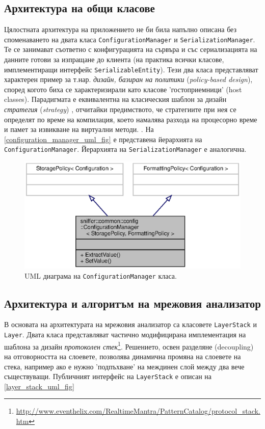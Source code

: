 \documentclass[12pt,a4paper,oneside]{book}
\begin{document}
\subsection{Архитектура на общи класове}

Цялостната архитектура на приложението не би била напълно описана без
споменаването на двата класа \texttt{ConfigurationManager} и
\texttt{SerializationManager}. Те се
занимават съответно с конфигурацията на сървъра и със сериализацията на данните
готови за изпращане до клиента (на практика всички класове, имплементиращи
интерфейс \texttt{SerializableEntity}). Тези два класа представляват характерен пример за т.нар.
\textit{дизайн, базиран на политики} (\textit{policy-based design}),
според когото биха се характеризирали като класове 'гостоприемници' (host
classes).  Парадигмата е
еквивалентна на класическия шаблон за дизайн \textit{стратегия}
(\textit{strategy}) \cite{gamma_design_1995},
отчитайки предимството, че стратегиите
при нея се определят по време на компилация, което намалява разхода на
процесорно време и памет за извикване на виртуални методи.
\cite{alexandrescu_modern_2001}.  На \autoref{configuration_manager_uml_fig} е
представена йерархията на \texttt{ConfigurationManager}. Йерархията на
\texttt{SerializationManager} е аналогична.

\begin{figure}[h!]
  \centering
  \includegraphics[scale=.7]{figures/configuration_manager_uml.eps}
  \caption{UML диаграма на \texttt{ConfigurationManager} класа.}
  \label{configuration_manager_uml_fig}
\end{figure}

\subsection{Архитектура и алгоритъм на мрежовия анализатор}

В основата на архитектурата на мрежовия анализатор са класовете
\texttt{LayerStack} и \texttt{Layer}. Двата класа представляват частично
модифицирана имплементация на шаблона за дизайн
\textit{протоколен стек}\footnote{\url{http://www.eventhelix.com/RealtimeMantra/PatternCatalog/protocol_stack.htm}}.
Решението, освен разделяне (decoupling) на
отговорността на слоевете, позволява динамична промяна на слоевете на стека,
например ако е нужно 'подпъхване' на междинен слой между два вече съществуващи.
Публичният интерфейс на \texttt{LayerStack} е описан на
\autoref{layer_stack_uml_fig}
\end{document}
